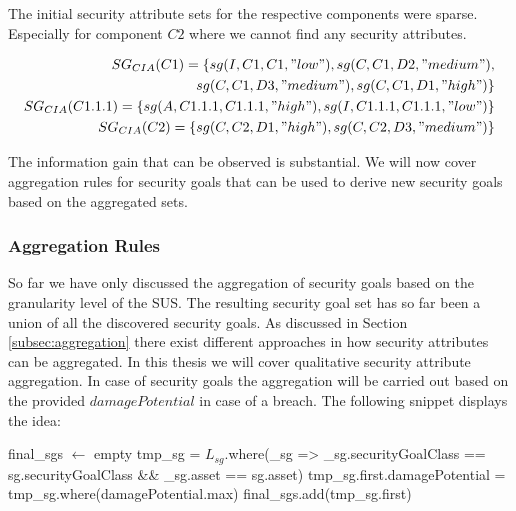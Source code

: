 \begingroup\vspace*{-\baselineskip}
\vspace*{\baselineskip}\endgroup

The initial security attribute sets for the respective components were sparse. Especially for component $C2$ where we cannot find any security attributes.

\begin{align*}
SG_{CIA}(C1) = \{sg(I,C1,C1,"low"), sg(C,C1,D2, "medium"),\\ sg(C,C1,D3,"medium"), sg(C,C1,D1,"high")\} \\
SG_{CIA}(C1.1.1) = \{sg(A,C1.1.1,C1.1.1,"high"), sg(I,C1.1.1,C1.1.1,"low")\} \\ 
SG_{CIA}(C2) = \{sg(C,C2,D1,"high"), sg(C,C2,D3,"medium")\}
\end{align*} 

\begingroup\vspace*{-\baselineskip}
\vspace*{\baselineskip}\endgroup

The information gain that can be observed is substantial. We will now cover aggregation rules for security goals that can be used to derive new security goals based on the aggregated sets. 

\subsubsection{Aggregation Rules}

So far we have only discussed the aggregation of security goals based on the granularity level of the SUS. The resulting security goal set has so far been a union of all the discovered security goals. As discussed in Section \ref{subsec:aggregation} there exist different approaches in how security attributes can be aggregated. In this thesis we will cover qualitative security attribute aggregation. In case of security goals the aggregation will be carried out based on the provided $damagePotential$ in case of a breach. The following snippet displays the idea:

\begin{algorithm}[H] 
\begin{algorithmic}
\State final\_sgs $\gets$ empty
\State tmp\_sg = $L_{sg}$.where(\_sg => \_sg.securityGoalClass == sg.securityGoalClass  \&\& \_sg.asset == sg.asset)
\State tmp\_sg.first.damagePotential = tmp\_sg.where(damagePotential.max)
\State final\_sgs.add(tmp\_sg.first)
\EndFor
\EndFunction
\end{algorithmic}
\end{algorithm}

